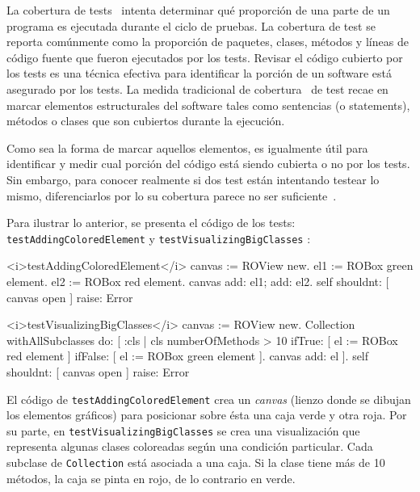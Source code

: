 \par La cobertura de tests~\cite{Horwi02a} intenta determinar qué proporción de una parte de un programa es ejecutada durante el ciclo de pruebas. La cobertura de test se reporta comúnmente como la proporción de paquetes, clases, métodos y líneas de código fuente que fueron ejecutados por los tests. Revisar el código cubierto por los tests es una técnica efectiva para identificar la porción de un software está asegurado por los tests. La medida tradicional de cobertura~\cite{Mock09a,Piwo93a} de test recae en marcar elementos estructurales del software tales como sentencias (o statements), métodos o clases que son cubiertos durante la ejecución.

\par Como sea la forma de marcar aquellos elementos, es igualmente útil para identificar y medir cual porción del código está siendo cubierta o no por los tests. Sin embargo, para conocer realmente si dos test están intentando testear lo mismo, diferenciarlos por lo su cobertura parece no ser suficiente~\cite{van2001refactoring,greiler2012test}.    

\par Para ilustrar lo anterior, se presenta el código de los tests: {\tt testAddingColoredElement} y {\tt testVisualizingBigClasses} :

\begin{codeWithLineNumbers}
<i>testAddingColoredElement</i>
	canvas := ROView new.
	el1 := ROBox green element.
	el2 := ROBox red element.
	canvas add: el1; add: el2.
	self shouldnt: [ canvas open ] raise: Error

<i>testVisualizingBigClasses</i>
	canvas := ROView new.
	Collection withAllSubclasses do: [ :cls |
		cls numberOfMethods > 10
			ifTrue: [ el := ROBox red element ]
			ifFalse: [ el := ROBox green element ].
		canvas add: el ].
	self shouldnt: [ canvas open ] raise: Error
\end{codeWithLineNumbers} 

\par El código de {\tt testAddingColoredElement} crea un \emph{canvas} (lienzo donde se dibujan los elementos gráficos) para posicionar sobre ésta una caja verde y otra roja. Por su parte, en {\tt testVisualizingBigClasses} se crea una visualización que representa algunas clases coloreadas según una condición particular. Cada subclase de {\tt Collection} está asociada a una caja. Si la clase tiene más de 10 métodos, la caja se pinta en rojo, de lo contrario en verde. 

